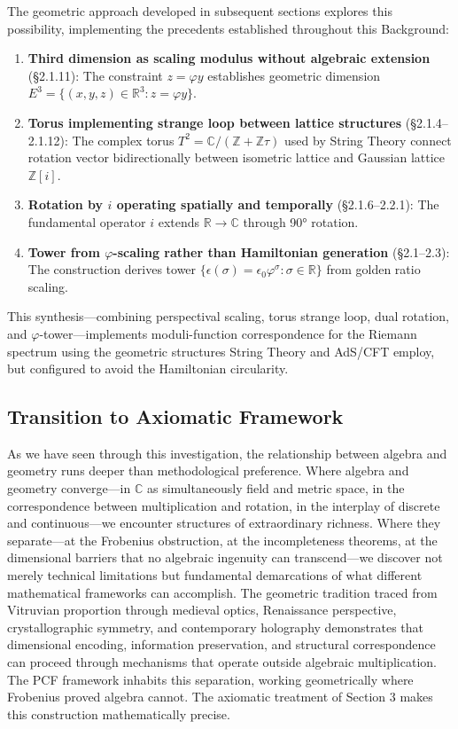 The geometric approach developed in subsequent sections explores this possibility, implementing the precedents established throughout this Background:
\begin{enumerate}
    \item \textbf{Third dimension as scaling modulus without algebraic extension} (\S 2.1.11): The constraint $z = \varphi y$ establishes geometric dimension $E^3 = \{(x,y,z) \in \mathbb{R}^3 : z = \varphi y\}$.
    \item \textbf{Torus implementing strange loop between lattice structures} (\S 2.1.4--2.1.12): The complex torus $T^2 = \mathbb{C}/(\mathbb{Z} + \mathbb{Z}\tau)$ used by String Theory connect rotation vector bidirectionally between isometric lattice and Gaussian lattice $\mathbb{Z}[i]$.
    \item \textbf{Rotation by $i$ operating spatially and temporally} (\S 2.1.6--2.2.1): The fundamental operator $i$ extends $\mathbb{R} \to \mathbb{C}$ through 90° rotation.
    \item \textbf{Tower from $\varphi$-scaling rather than Hamiltonian generation} (\S 2.1--2.3): The construction derives tower $\{\epsilon(\sigma) = \epsilon_0\varphi^\sigma : \sigma \in \mathbb{R}\}$ from golden ratio scaling.
\end{enumerate}

This synthesis—combining perspectival scaling, torus strange loop, dual rotation, and $\varphi$-tower—implements moduli-function correspondence for the Riemann spectrum using the geometric structures String Theory and AdS/CFT employ, but configured to avoid the Hamiltonian circularity.

\subsection{Transition to Axiomatic Framework} \label{sec:transition-axioms}

As we have seen through this investigation, the relationship between algebra and geometry runs deeper than methodological preference. Where algebra and geometry converge—in $\mathbb{C}$ as simultaneously field and metric space, in the correspondence between multiplication and rotation, in the interplay of discrete and continuous—we encounter structures of extraordinary richness. Where they separate—at the Frobenius obstruction, at the incompleteness theorems, at the dimensional barriers that no algebraic ingenuity can transcend—we discover not merely technical limitations but fundamental demarcations of what different mathematical frameworks can accomplish. The geometric tradition traced from Vitruvian proportion through medieval optics, Renaissance perspective, crystallographic symmetry, and contemporary holography demonstrates that dimensional encoding, information preservation, and structural correspondence can proceed through mechanisms that operate outside algebraic multiplication. The PCF framework inhabits this separation, working geometrically where Frobenius proved algebra cannot. The axiomatic treatment of Section 3 makes this construction mathematically precise.
